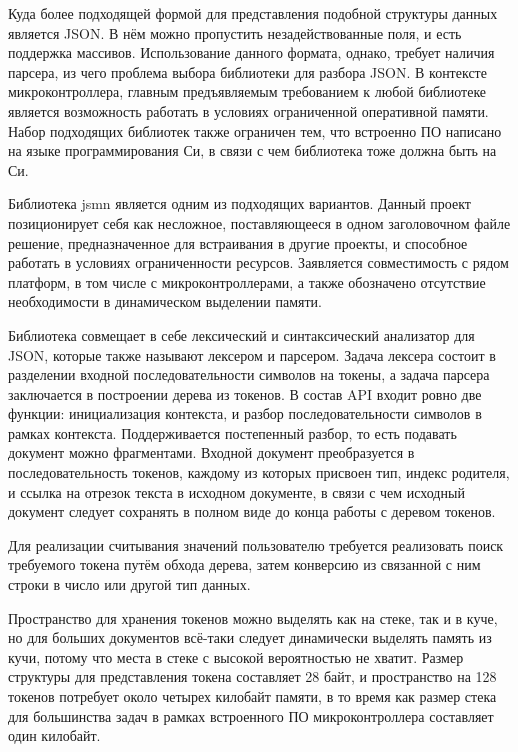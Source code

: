\documentclass{report}
\begin{document}
Куда более подходящей формой для представления подобной структуры данных является JSON. В нём можно пропустить незадействованные поля, и есть поддержка массивов. Использование данного формата, однако, требует наличия парсера, из чего проблема выбора библиотеки для разбора JSON. В контексте микроконтроллера, главным предъявляемым требованием к любой библиотеке является возможность работать в условиях ограниченной оперативной памяти. Набор подходящих библиотек также ограничен тем, что встроенно ПО написано на языке программирования Си, в связи с чем библиотека тоже должна быть на Си.

Библиотека jsmn \cite{jsmn} является одним из подходящих вариантов. Данный проект позиционирует себя как несложное, поставляющееся в одном заголовочном файле решение, предназначенное для встраивания в другие проекты, и способное работать в условиях ограниченности ресурсов. Заявляется совместимость с рядом платформ, в том числе с микроконтроллерами, а также обозначено отсутствие необходимости в динамическом выделении памяти.

Библиотека совмещает в себе лексический и синтаксический анализатор для JSON, которые также называют лексером и парсером. Задача лексера состоит в разделении входной последовательности символов на токены, а задача парсера заключается в построении дерева из токенов. В состав API входит ровно две функции: инициализация контекста, и разбор последовательности символов в рамках контекста. Поддерживается постепенный разбор, то есть подавать документ можно фрагментами. Входной документ преобразуется в последовательность токенов, каждому из которых присвоен тип, индекс родителя, и ссылка на отрезок текста в исходном документе, в связи с чем исходный документ следует сохранять в полном виде до конца работы с деревом токенов.

Для реализации считывания значений пользователю требуется реализовать поиск требуемого токена путём обхода дерева, затем конверсию из связанной с ним строки в число или другой тип данных.

Пространство для хранения токенов можно выделять как на стеке, так и в куче, но для больших документов всё-таки следует динамически выделять память из кучи, потому что места в стеке с высокой вероятностью не хватит. Размер структуры для представления токена составляет 28 байт, и пространство на 128 токенов потребует около четырех килобайт памяти, в то время как размер стека для большинства задач в рамках встроенного ПО микроконтроллера составляет один килобайт.
\end{document}
